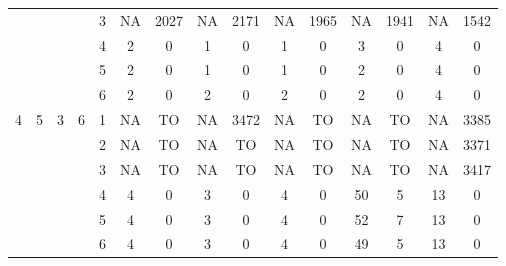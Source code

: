 \begin{longtable}{|c|c|c|c|c|c c|c c|c c|c c|c c|}
 & & & & 3 & NA & 2027 & NA & 2171 & NA & 1965 & NA & 1941 & NA & 1542 \\
 & & & & 4 & 2 & 0 & 1 & 0 & 1 & 0 & 3 & 0 & 4 & 0 \\
 & & & & 5 & 2 & 0 & 1 & 0 & 1 & 0 & 2 & 0 & 4 & 0 \\
 & & & & 6 & 2 & 0 & 2 & 0 & 2 & 0 & 2 & 0 & 4 & 0 \\
\hline
\multirow{6}{*}{4} & \multirow{6}{*}{5} & \multirow{6}{*}{3} & \multirow{6}{*}{6} & 1 & NA & TO & NA & 3472 & NA & TO & NA & TO & NA & 3385 \\
 & & & & 2 & NA & TO & NA & TO & NA & TO & NA & TO & NA & 3371 \\
 & & & & 3 & NA & TO & NA & TO & NA & TO & NA & TO & NA & 3417 \\
 & & & & 4 & 4 & 0 & 3 & 0 & 4 & 0 & 50 & 5 & 13 & 0 \\
 & & & & 5 & 4 & 0 & 3 & 0 & 4 & 0 & 52 & 7 & 13 & 0 \\
 & & & & 6 & 4 & 0 & 3 & 0 & 4 & 0 & 49 & 5 & 13 & 0 \\
\hline
\end{longtable}